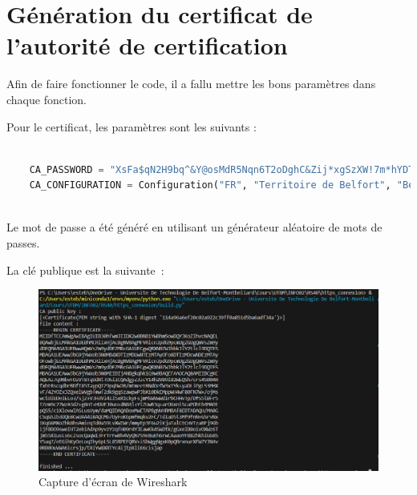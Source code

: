 \documentclass[11pt]{article}
\begin{document}
\section{Génération du certificat de l'autorité de certification}

Afin de faire fonctionner le code, il a fallu mettre les bons paramètres dans chaque fonction.

Pour le certificat, les paramètres sont les suivants :

\begin{lstlisting}[language=Python]

    CA_PASSWORD = "XsFa$qN2H9bq^&Y@osMdR5Nqn6T2oDghC&Zij*xgSzXW!7m*hYDToVZukWFKVsaZo9hjSaprUftufpimcSdvhg2k!BwcZp5E4LjGoFEe$QHkLv65ozk*MGee8#BFfsHL"
    CA_CONFIGURATION = Configuration("FR", "Territoire de Belfort", "Belfort", "EstebanBecker_CA", "localhost") 
    
\end{lstlisting}

Le mot de passe a été généré en utilisant un générateur aléatoire de mots de passes.

La clé publique est la suivante :

\begin{figure}[!htb]
    \centering
    \includegraphics[width=\textwidth]{images/Certificat.png}
    \caption{Capture d'écran de Wireshark}
    \label{fig:Certificat}
\end{figure}
\end{document}
